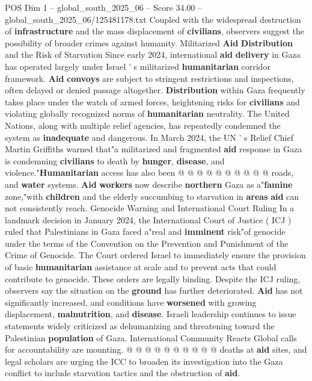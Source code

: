 \begin{textsample}{POS Dim 1 – global\_south\_2025\_06 – Score 34.00 – global\_south\_2025\_06/125481178.txt}
Coupled with the widespread destruction of \textbf{infrastructure} and the mass displacement of \textbf{civilians}, observers suggest the possibility of broader crimes against humanity.
Militarized \textbf{Aid} \textbf{Distribution} and the Risk of Starvation Since early 2024, international \textbf{aid} \textbf{delivery} in Gaza has operated largely under Israel ' s militarized \textbf{humanitarian} corridor framework. \textbf{Aid} \textbf{convoys} are subject to stringent restrictions and inspections, often delayed or denied passage altogether. \textbf{Distribution} within Gaza frequently takes place under the watch of armed forces, heightening risks for \textbf{civilians} and violating globally recognized norms of \textbf{humanitarian} neutrality.
The United Nations, along with multiple relief agencies, has repeatedly condemned the system as \textbf{inadequate} and dangerous.
In March 2024, the UN ' s Relief Chief Martin Griffiths warned that"a militarized and fragmented \textbf{aid} response in Gaza is condemning \textbf{civilians} to death by \textbf{hunger}, \textbf{disease}, and violence."\textbf{Humanitarian} access has also been @ @ @ @ @ @ @ @ @ @ roads, and \textbf{water} systems. \textbf{Aid} \textbf{workers} now describe \textbf{northern} Gaza as a"\textbf{famine} zone,"with \textbf{children} and the elderly succumbing to starvation in \textbf{areas} \textbf{aid} can not consistently reach.
Genocide Warning and International Court Ruling In a landmark decision in January 2024, the International Court of Justice ( ICJ ) ruled that Palestinians in Gaza faced a"real and \textbf{imminent} risk"of genocide under the terms of the Convention on the Prevention and Punishment of the Crime of Genocide.
The Court ordered Israel to immediately ensure the provision of basic \textbf{humanitarian} assistance at scale and to prevent acts that could contribute to genocide.
These orders are legally binding.
Despite the ICJ ruling, observers say the situation on the \textbf{ground} has further deteriorated. \textbf{Aid} has not significantly increased, and conditions have \textbf{worsened} with growing displacement, \textbf{malnutrition}, and \textbf{disease}.
Israeli leadership continues to issue statements widely criticized as dehumanizing and threatening toward the Palestinian \textbf{population} of Gaza.
International Community Reacts Global calls for accountability are mounting. @ @ @ @ @ @ @ @ @ @ deaths at \textbf{aid} sites, and legal scholars are urging the ICC to broaden its investigation into the Gaza conflict to include starvation tactics and the obstruction of \textbf{aid}.

\end{textsample}
